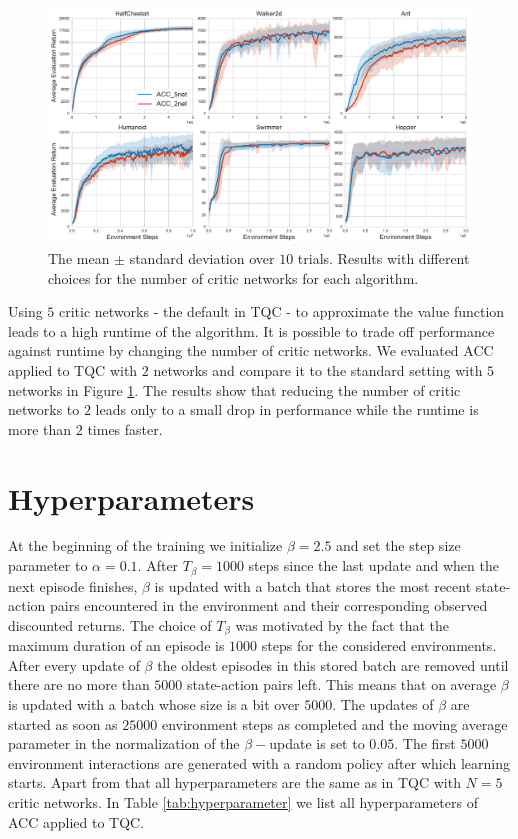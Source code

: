 \begin{figure}[t]
\centering
  \includegraphics[width=.8\linewidth]{images/ablation/2net_one_fig.pdf}
\caption{The mean $\pm$ standard deviation over $10$ trials. 
Results with different choices for the number of critic networks for each algorithm. }
\label{fig:num_critic_nets}
\end{figure}
Using $5$ critic networks - the default in TQC - to approximate the value function leads to a high runtime of the algorithm. It is possible to trade off performance against runtime by changing the number of critic networks. We evaluated ACC applied to TQC with $2$ networks and compare it to the standard setting with $5$ networks in Figure \ref{fig:num_critic_nets}. The results show that reducing the number of critic networks to $2$ leads only to a small drop in performance while the runtime is more than $2$ times faster.







\section{Hyperparameters}
\label{app:hyperparameter}

At the beginning of the training we initialize $\beta = 2.5$ and set the step size parameter to $\alpha=0.1$.
After $T_\beta = 1000$ steps since the last update and when the next episode finishes, $\beta$ is updated with a batch that stores the most recent state-action pairs encountered in the environment and their corresponding observed discounted returns. 
The choice of $T_\beta$ was motivated by the fact that the maximum duration of an episode is $1000$ steps for the considered environments.
After every update of $\beta$ the oldest episodes in this stored batch are removed until there are no more than $5000$ state-action pairs left. This means that on average $\beta$ is updated with a batch whose size is a bit over $5000$. 
The updates of $\beta$ are started as soon as $25000$ environment steps as completed and
the moving average parameter in the normalization of the $\beta-$update is set to $0.05$. 
The  first $5000$ environment interactions are generated with a random policy after which learning starts.
Apart from that all hyperparameters are the same as in TQC with $N=5$ critic networks.
In Table \ref{tab:hyperparameter} we list all hyperparameters of ACC applied to TQC.

